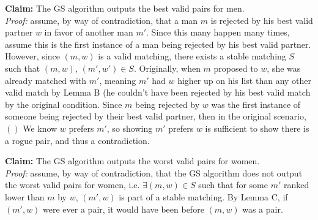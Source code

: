 \documentclass[12pt]{article}
\begin{document}
\textbf{Claim: }The GS algorithm outputs the best valid pairs for men.\\
\emph{Proof: }assume, by way of contradiction, that a man $m$ is rejected by his best valid partner $w$ in favor of another man $m'$. Since this many happen many times, assume this is the first instance of a man being rejected by his best valid partner. However, since $(m, w)$ is a valid matching, there exists a stable matching $S$ such that $(m, w)$, $(m', w') \in S$. Originally, when $m$ proposed to $w$, she was already matched with $m'$, meaning $m'$ had $w$ higher up on his list than any other valid match by Lemma B (he couldn't have been rejected by his best valid match by the original condition. Since $m$ being rejected by $w$ was the first instance of someone being rejected by their best valid partner, then in the original scenario, $()$ We know $w$ prefers $m'$, so showing $m'$ prefers $w$ is sufficient to show there is a rogue pair, and thus a contradiction. 

\textbf{Claim: }The GS algorithm outputs the worst valid pairs for women.\\
\emph{Proof: }assume, by way of contradiction, that the GS algorithm does not output the worst valid pairs for women, i.e. $\exists (m, w) \in S$ such that for some $m'$ ranked lower than $m$ by $w$, $(m', w)$ is part of a stable matching. By Lemma C, if $(m', w)$ were ever a pair, it would have been before $(m, w)$ was a pair.
\end{document}
